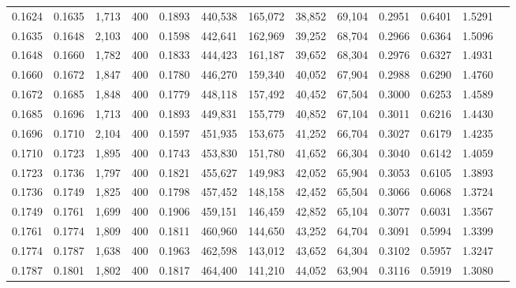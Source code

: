 \begin{tabular}{rrrrrrrrrrrrr}
0.1624 & 0.1635 &  1,713 & 400 &                                     0.1893 & 440,538 & 165,072 &  38,852 &  69,104 & 0.2951 & 0.6401 & 1.5291 \\
0.1635 & 0.1648 &  2,103 & 400 &                                     0.1598 & 442,641 & 162,969 &  39,252 &  68,704 & 0.2966 & 0.6364 & 1.5096 \\
0.1648 & 0.1660 &  1,782 & 400 &                                     0.1833 & 444,423 & 161,187 &  39,652 &  68,304 & 0.2976 & 0.6327 & 1.4931 \\
0.1660 & 0.1672 &  1,847 & 400 &                                     0.1780 & 446,270 & 159,340 &  40,052 &  67,904 & 0.2988 & 0.6290 & 1.4760 \\
0.1672 & 0.1685 &  1,848 & 400 &                                     0.1779 & 448,118 & 157,492 &  40,452 &  67,504 & 0.3000 & 0.6253 & 1.4589 \\
0.1685 & 0.1696 &  1,713 & 400 &                                     0.1893 & 449,831 & 155,779 &  40,852 &  67,104 & 0.3011 & 0.6216 & 1.4430 \\
0.1696 & 0.1710 &  2,104 & 400 &                                     0.1597 & 451,935 & 153,675 &  41,252 &  66,704 & 0.3027 & 0.6179 & 1.4235 \\
0.1710 & 0.1723 &  1,895 & 400 &                                     0.1743 & 453,830 & 151,780 &  41,652 &  66,304 & 0.3040 & 0.6142 & 1.4059 \\
0.1723 & 0.1736 &  1,797 & 400 &                                     0.1821 & 455,627 & 149,983 &  42,052 &  65,904 & 0.3053 & 0.6105 & 1.3893 \\
0.1736 & 0.1749 &  1,825 & 400 &                                     0.1798 & 457,452 & 148,158 &  42,452 &  65,504 & 0.3066 & 0.6068 & 1.3724 \\
0.1749 & 0.1761 &  1,699 & 400 &                                     0.1906 & 459,151 & 146,459 &  42,852 &  65,104 & 0.3077 & 0.6031 & 1.3567 \\
0.1761 & 0.1774 &  1,809 & 400 &                                     0.1811 & 460,960 & 144,650 &  43,252 &  64,704 & 0.3091 & 0.5994 & 1.3399 \\
0.1774 & 0.1787 &  1,638 & 400 &                                     0.1963 & 462,598 & 143,012 &  43,652 &  64,304 & 0.3102 & 0.5957 & 1.3247 \\
0.1787 & 0.1801 &  1,802 & 400 &                                     0.1817 & 464,400 & 141,210 &  44,052 &  63,904 & 0.3116 & 0.5919 & 1.3080 \\

\end{tabular}
